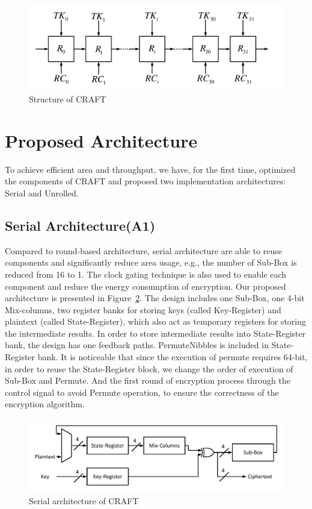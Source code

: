 \documentclass[sn-basic]{sn-jnl}%
\begin{document}
\begin{figure}[h]%
    \centering
    \includegraphics[width=\textwidth]{struct-craft.pdf}
    \caption{Structure of CRAFT}\label{fig1}
\end{figure}


\section{Proposed Architecture}\label{sec3}

To achieve efficient area and throughput, we have, for the first time, optimized the components of CRAFT and proposed two implementation architectures: Serial and Unrolled.


\subsection{Serial Architecture(A1)}\label{subsec2}
Compared to round-based architecture, serial architecture are able to reuse components and significantly reduce area usage, e.g., the number of Sub-Box is reduced from 16 to 1.
The clock gating technique is also used to enable each component and reduce the energy consumption of encryption. Our proposed architecture is presented in Figure~\ref{fig3}.
The design includes one Sub-Box, one 4-bit Mix-columns, two register banks for storing keys (called Key-Register) and plaintext (called State-Register), which also act as temporary registers for storing the intermediate results.
In order to store intermediate results into State-Register bank, the design has one feedback paths.
PermuteNibbles is included in State-Register bank.
It is noticeable that since the execution of permute requires 64-bit, in order to reuse the State-Register block, we change the order of execution of Sub-Box and Permute.
And the first round of encryption process through the control signal to avoid Permute operation, to ensure the correctness of the encryption algorithm.

\begin{figure}[h]%
    \centering
    \includegraphics[width=\textwidth]{serial-archticture.pdf}
    \caption{Serial architecture of CRAFT}\label{fig3}
\end{figure}
\end{document}
